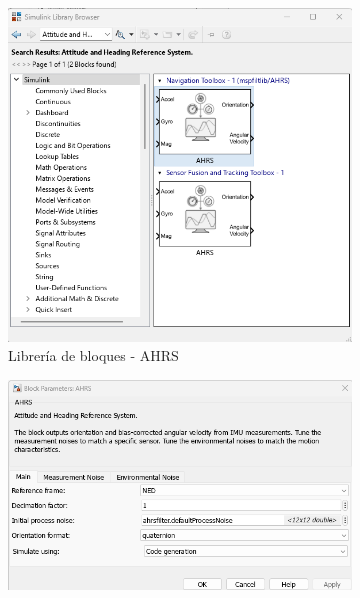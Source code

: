 \begin{figure}[htbp]
    \centering
    \begin{subfigure}[b]{0.35\textwidth}
        \centering
        \includegraphics[width=\textwidth]{fig/Capitulo5/Caso_de_estudio_IMU/Generador_de_salidas/libreira_de_bloques_sensor_AHRS.png}
        \caption{Librería de bloques - AHRS}
        \label{fig:lib_bloques_AHRS}
    \end{subfigure}
    \hfill
    \begin{subfigure}[b]{0.45\textwidth}
        \centering
        \includegraphics[width=\textwidth]{fig/Capitulo5/Caso_de_estudio_IMU/Generador_de_salidas/configuracion_AHRS_01.png}

\end{subfigure}
\end{figure}
